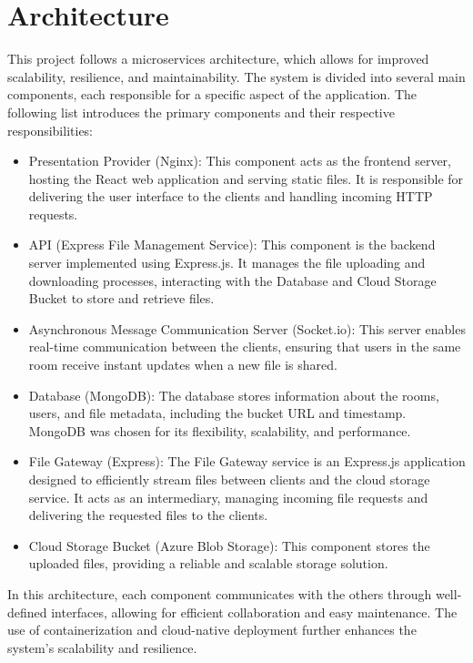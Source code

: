 \documentclass[a4paper,fleqn]{cas-sc}
\begin{document}
\section{Architecture}\label{sec:architecture}

This project follows a microservices architecture, which allows for improved scalability, resilience, and maintainability. The system is divided into several main components, each responsible for a specific aspect of the application. The following list introduces the primary components and their respective responsibilities:

\begin{itemize}
\item Presentation Provider (Nginx): This component acts as the frontend server, hosting the React web application and serving static files. It is responsible for delivering the user interface to the clients and handling incoming HTTP requests.
\item API (Express File Management Service): This component is the backend server implemented using Express.js. It manages the file uploading and downloading processes, interacting with the Database and Cloud Storage Bucket to store and retrieve files.
\item Asynchronous Message Communication Server (Socket.io): This server enables real-time communication between the clients, ensuring that users in the same room receive instant updates when a new file is shared.
\item Database (MongoDB): The database stores information about the rooms, users, and file metadata, including the bucket URL and timestamp. MongoDB was chosen for its flexibility, scalability, and performance.
\item File Gateway (Express): The File Gateway service is an Express.js application designed to efficiently stream files between clients and the cloud storage service. It acts as an intermediary, managing incoming file requests and delivering the requested files to the clients.
\item Cloud Storage Bucket (Azure Blob Storage): This component stores the uploaded files, providing a reliable and scalable storage solution.
\end{itemize}

In this architecture, each component communicates with the others through well-defined interfaces, allowing for efficient collaboration and easy maintenance. The use of containerization and cloud-native deployment further enhances the system's scalability and resilience.
\end{document}

